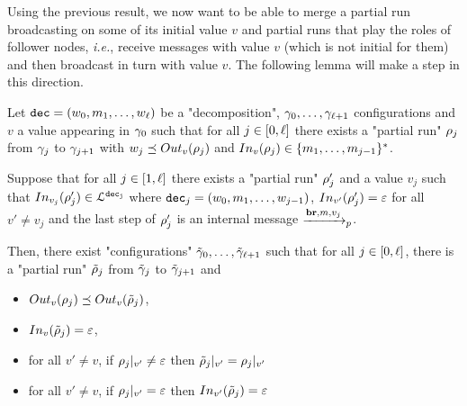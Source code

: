 Using the previous result, we now want to be able to merge a partial run broadcasting on some of its initial value $v$ and partial runs that play the roles of follower nodes, \emph{i.e.}, receive messages with value $v$ (which is not initial for them) and then broadcast in turn with value $v$. The following lemma will make a step in this direction.

\begin{lemma}
	\label{lem:follower-composition-completion}
	Let $\decsymb = (w_0, m_1, \ldots, w_\ell)$ be a "decomposition", $\config_0, \ldots, \config_{\ell+1}$ configurations and $v$ a value appearing in $\config_0$ such that for all $j \in\nset{0}{\ell}$ there exists a "partial run" $\run_j$ from $\config_{j}$ to $\config_{j+1}$ with $w_j \subword \voutput{v}{\run_j}$ and $\vinput{v}{\run_j} \in \set{m_1,\ldots, m_{j-1}}^*$. 
	
	Suppose that for all $j \in\nset{1}{\ell}$ there exists a "partial run" $\run'_j$ and a value $v_j$ such that $\vinput{v_j}{\run'_j} \in \langdec{\decsymb_j}$ where $\decsymb_j = (w_0, m_1, \ldots, w_{j-1})$, $\vinput{v'}{\run'_j} = \varepsilon$ for all $v' \neq v_j$ and the last step of $\run'_j$ is an internal message $\intmessage{m}{v_j}$.
	
	Then, there exist "configurations" $\Tilde{\config}_0, \ldots, \Tilde{\config}_{\ell+1}$ such that for all $j \in\nset{0}{\ell}$, there is a "partial run" $\Tilde{\run}_j$ from $\Tilde{\config}_j$ to $\Tilde{\config}_{j+1}$ and
	\begin{itemize}
		\item $\voutput{v}{\run_j} \subword \voutput{v}{\Tilde{\run}_j}$, 
		
		\item $\vinput{v}{\Tilde{\run}_j} = \varepsilon$,
		
		\item for all $v' \neq v$, if $\vproj{v'}{\run_j} \neq \varepsilon$ then $\vproj{v'}{\Tilde{\run}_j} = \vproj{v'}{\run_j}$
		
		\item for all $v' \neq v$, if $\vproj{v'}{\run_j} = \varepsilon$ then $\vinput{v'}{\Tilde{\run}_j} = \varepsilon$
\end{itemize}
\end{lemma}


